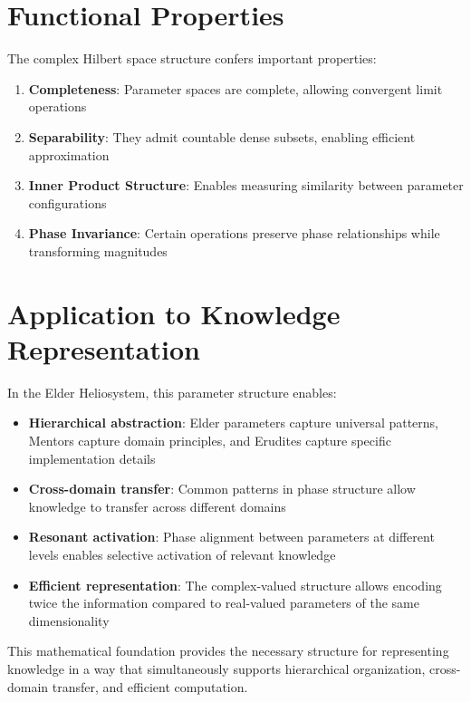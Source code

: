 \section{Functional Properties}

The complex Hilbert space structure confers important properties:

\begin{enumerate}
    \item \textbf{Completeness}: Parameter spaces are complete, allowing convergent limit operations
    
    \item \textbf{Separability}: They admit countable dense subsets, enabling efficient approximation
    
    \item \textbf{Inner Product Structure}: Enables measuring similarity between parameter configurations
    
    \item \textbf{Phase Invariance}: Certain operations preserve phase relationships while transforming magnitudes
\end{enumerate}

\section{Application to Knowledge Representation}

In the Elder Heliosystem, this parameter structure enables:

\begin{itemize}
    \item \textbf{Hierarchical abstraction}: Elder parameters capture universal patterns, Mentors capture domain principles, and Erudites capture specific implementation details
    
    \item \textbf{Cross-domain transfer}: Common patterns in phase structure allow knowledge to transfer across different domains
    
    \item \textbf{Resonant activation}: Phase alignment between parameters at different levels enables selective activation of relevant knowledge
    
    \item \textbf{Efficient representation}: The complex-valued structure allows encoding twice the information compared to real-valued parameters of the same dimensionality
\end{itemize}

This mathematical foundation provides the necessary structure for representing knowledge in a way that simultaneously supports hierarchical organization, cross-domain transfer, and efficient computation.